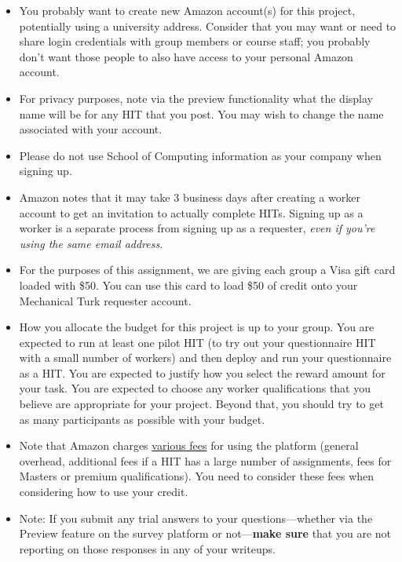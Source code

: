 \documentclass{article}
\begin{document}
\begin{itemize}
    \item You probably want to create new Amazon account(s) for this project, potentially using a university address. Consider that you may want or need to share login credentials with group members or course staff; you probably don't want those people to also have access to your personal Amazon account.
    
    \item For privacy purposes, note via the preview functionality what the display name will be for any HIT that you post. You may wish to change the name associated with your account.
    
    \item Please do not use School of Computing information as your company when signing up.
    
    \item Amazon notes that it may take 3 business days after creating a worker account to get an invitation to actually complete HITs. Signing up as a worker is a separate process from signing up as a requester, \textit{even if you're using the same email address}.
    
    \item For the purposes of this assignment, we are giving each group a Visa gift card loaded with \$50. You can use this card to load \$50 of credit onto your Mechanical Turk requester account.
    
    \item How you allocate the budget for this project is up to your group. You are expected to run at least one pilot HIT (to try out your questionnaire HIT with a small number of workers) and then deploy and run your questionnaire as a HIT. You are expected to justify how you select the reward amount for your task. You are expected to choose any worker qualifications that you believe are appropriate for your project. Beyond that, you should try to get as many participants as possible with your budget.
    
    \item Note that Amazon charges \href{https://www.mturk.com/pricing}{various fees} for using the platform (general overhead, additional fees if a HIT has a large number of assignments, fees for Masters or premium qualifications). You need to consider these fees when considering how to use your credit.
    
    \item Note: If you submit any trial answers to your questions---whether via the Preview feature on the survey platform or not---\textbf{make sure} that you are not reporting on those responses in any of your writeups.


\end{itemize}
\end{document}
